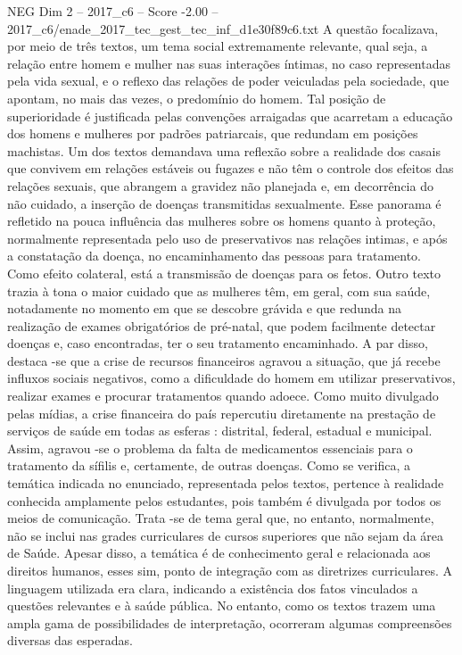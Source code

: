\begin{textsample}{NEG Dim 2 – 2017\_c6 – Score -2.00 – 2017\_c6/enade\_2017\_tec\_gest\_tec\_inf\_d1e30f89c6.txt}
A questão focalizava, por meio de três textos, um tema social extremamente relevante, qual seja, a relação entre homem e mulher nas suas interações íntimas, no caso representadas pela vida sexual, e o reflexo das relações de poder veiculadas pela sociedade, que apontam, no mais das vezes, o predomínio do homem.
Tal posição de superioridade é justificada pelas convenções arraigadas que acarretam a educação dos homens e mulheres por padrões patriarcais, que redundam em posições machistas.
Um dos textos demandava uma reflexão sobre a realidade dos casais que convivem em relações estáveis ou fugazes e não têm o controle dos efeitos das relações sexuais, que abrangem a gravidez não planejada e, em decorrência do não cuidado, a inserção de doenças transmitidas sexualmente.
Esse panorama é refletido na pouca influência das mulheres sobre os homens quanto à proteção, normalmente representada pelo uso de preservativos nas relações intimas, e após a constatação da doença, no encaminhamento das pessoas para tratamento.
Como efeito colateral, está a transmissão de doenças para os fetos.
Outro texto trazia à tona o maior cuidado que as mulheres têm, em geral, com sua saúde, notadamente no momento em que se descobre grávida e que redunda na realização de exames obrigatórios de pré-natal, que podem facilmente detectar doenças e, caso encontradas, ter o seu tratamento encaminhado.
A par disso, destaca -se que a crise de recursos financeiros agravou a situação, que já recebe influxos sociais negativos, como a dificuldade do homem em utilizar preservativos, realizar exames e procurar tratamentos quando adoece.
Como muito divulgado pelas mídias, a crise financeira do país repercutiu diretamente na prestação de serviços de saúde em todas as esferas : distrital, federal, estadual e municipal.
Assim, agravou -se o problema da falta de medicamentos essenciais para o tratamento da sífilis e, certamente, de outras doenças.
Como se verifica, a temática indicada no enunciado, representada pelos textos, pertence à realidade conhecida amplamente pelos estudantes, pois também é divulgada por todos os meios de comunicação.
Trata -se de tema geral que, no entanto, normalmente, não se inclui nas grades curriculares de cursos superiores que não sejam da área de Saúde.
Apesar disso, a temática é de conhecimento geral e relacionada aos direitos humanos, esses sim, ponto de integração com as diretrizes curriculares.
A linguagem utilizada era clara, indicando a existência dos fatos vinculados a questões relevantes e à saúde pública.
No entanto, como os textos trazem uma ampla gama de possibilidades de interpretação, ocorreram algumas compreensões diversas das esperadas.

\end{textsample}
